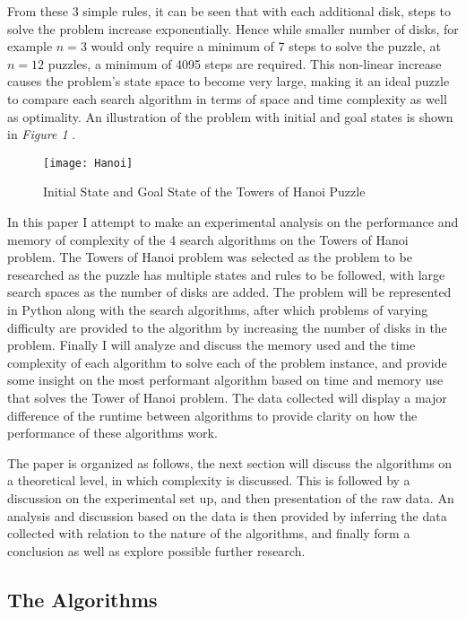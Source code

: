 \documentclass[conference]{IEEEtran}
\begin{document}
From these 3 simple rules, it can be seen that with each additional disk, steps to solve the problem increase exponentially. Hence while smaller number of disks, for example $n = 3$ would only require a minimum of 7 steps to solve the puzzle, at $n = 12$ puzzles, a minimum of 4095 steps are required. This non-linear increase causes the problem's state space to become very large, making it an ideal puzzle to compare each search algorithm in terms of space and time complexity as well as optimality. An illustration of the problem with initial and goal states is shown in \textit{Figure 1} \cite{cmu_paper}.

\begin{figure}
\centering
\texttt{[image: Hanoi]}
\caption{Initial State and Goal State of the Towers of Hanoi Puzzle }
\label{fig:my_hanoi}
\end{figure}

In this paper I attempt to make an experimental analysis on the performance and memory of complexity of the 4 search algorithms on the Towers of Hanoi problem. The Towers of Hanoi problem was selected as the problem to be researched as the puzzle has multiple states and rules to be followed, with large search spaces as the number of disks are added. The problem will be represented in Python along with the search algorithms, after which problems of varying difficulty are provided to the algorithm by increasing the number of disks in the problem. Finally I will analyze and discuss the memory used and the time complexity of each algorithm to solve each of the problem instance, and provide some insight on the most performant algorithm based on time and memory use that solves the Tower of Hanoi problem. The data collected will display a major difference of the runtime between algorithms to provide clarity on how the performance of these algorithms work. 

The paper is organized as follows, the next section will discuss the algorithms on a theoretical level, in which complexity is discussed. This is followed by a discussion on the experimental set up, and then presentation of the raw data. An analysis and discussion based on the data is then provided by inferring the data collected with relation to the nature of the algorithms, and finally form a conclusion as well as explore possible further research.


\subsection{The Algorithms}
\end{document}
